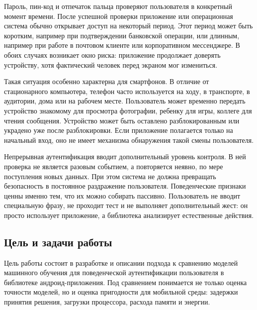 \documentclass[oneside,senior,etd]{BYUPhys}
\begin{document}
Пароль, пин-код и отпечаток пальца проверяют пользователя в конкретный момент времени. После успешной проверки приложение или операционная система обычно открывает доступ на некоторый период. Этот период может быть коротким, например при подтверждении банковской операции, или длинным, например при работе в почтовом клиенте или корпоративном мессенджере. В обоих случаях возникает окно риска: приложение продолжает доверять устройству, хотя фактический человек перед экраном мог измениться.

Такая ситуация особенно характерна для смартфонов. В отличие от стационарного компьютера, телефон часто используется на ходу, в транспорте, в аудитории, дома или на рабочем месте. Пользователь может временно передать устройство знакомому для просмотра фотографии, ребенку для игры, коллеге для чтения сообщения. Устройство может быть оставлено разблокированным или украдено уже после разблокировки. Если приложение полагается только на начальный вход, оно не имеет механизма обнаружения такой смены пользователя.

Непрерывная аутентификация вводит дополнительный уровень контроля. В ней проверка не является разовым событием, а повторяется неявно, по мере поступления новых данных. При этом система не должна превращать безопасность в постоянное раздражение пользователя. Поведенческие признаки ценны именно тем, что их можно собирать пассивно. Пользователь не вводит специальную фразу, не проходит тест и не выполняет дополнительный жест: он просто использует приложение, а библиотека анализирует естественные действия.

\subsection{Цель и задачи работы}

Цель работы состоит в разработке и описании подхода к сравнению моделей машинного обучения для поведенческой аутентификации пользователя в библиотеке андроид-приложения. Под сравнением понимается не только оценка точности моделей, но и оценка пригодности для мобильной среды: задержки принятия решения, загрузки процессора, расхода памяти и энергии.
\end{document}

